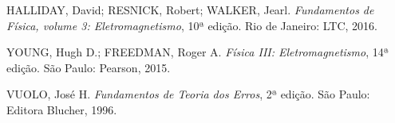 \documentclass[a4paper,12pt]{article}
\begin{document}
\begin{thebibliography}{99}

HALLIDAY, David; RESNICK, Robert; WALKER, Jearl. 
\textit{Fundamentos de Física, volume 3: Eletromagnetismo}, 10ª edição. 
Rio de Janeiro: LTC, 2016.

YOUNG, Hugh D.; FREEDMAN, Roger A. 
\textit{Física III: Eletromagnetismo}, 14ª edição. 
São Paulo: Pearson, 2015.

VUOLO, José H. 
\textit{Fundamentos de Teoria dos Erros}, 2ª edição.
São Paulo: Editora Blucher, 1996.

\end{thebibliography}
\end{document}
